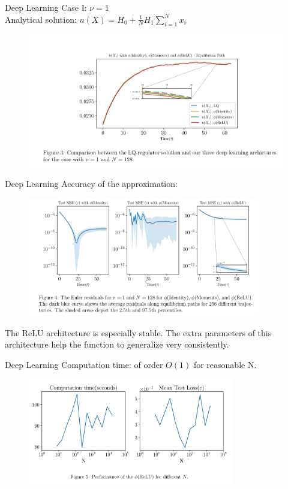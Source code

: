 \documentclass[dvipsnames,mathserif]{beamer}
\begin{document}
{\begin{frame}{Deep Learning}
Case I: $\nu = 1$\\
Analytical solution: $u(X) = H_0 + \frac{1}{N}H_1\sum_{i=1}^{N}x_i$
\begin{figure}[h!]
\centering
\includegraphics[width = 1.1\textwidth]{3.png}
\end{figure}
\end{frame}

\begin{frame}{Deep Learning}
Accuracy of the approximation:
\begin{figure}[h!]
\centering
\includegraphics[width = 0.9\textwidth]{4.png}
\end{figure}
The ReLU architecture is especially stable. The extra parameters of this architecture help the function to generalize very consistently.
\end{frame}

\begin{frame}{Deep Learning}
Computation time: of order $O(1)$ for reasonable N.
\begin{figure}[h!]
\centering
\includegraphics[width = 0.8\textwidth]{5.png}
\end{figure}
\end{frame}

}
\end{document}
